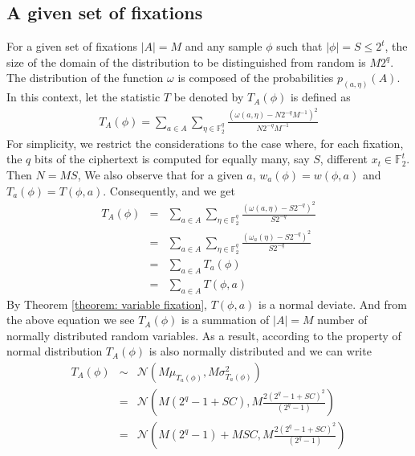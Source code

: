 \subsection{A given set of fixations}
For a given set of fixations $|A|=M$ and any sample $\phi$ such that $\lvert \phi \rvert = S \leq 2^t$, the size of the domain of the distribution to be distinguished from random is $M2^q$. The distribution of the function $\omega$ is composed of the probabilities $p_{\left(a,\eta\right)}(A)$. In this context, let the statistic $T$ be denoted by $T_{A}\left(\phi\right)$ is defined as
\begin{eqnarray}
T_{A}(\phi) = \displaystyle\sum_{a \in A}\displaystyle\sum_{\eta \in \mathbb{F}_{2}^{q}} \frac{(\omega(a,\eta) - N2^{-q}M^{-1})^2}{N2^{-q}M^{-1}}
\label{eqn:T_for_a_set_of_fixations}
\end{eqnarray} For simplicity, we restrict the considerations to the case where, for each
fixation, the $q$ bits of the ciphertext is computed for equally many, say $S$, different $x_t \in \mathbb{F}_{2}^{t}$. Then $N = MS$, We also observe that for a given $a$, $w_a\left(\phi\right) = w\left(\phi,a\right)$ and $T_{a}\left( \phi \right) = T\left(\phi,a\right)$. Consequently, and we get 
\begin{eqnarray*}
T_{A}(\phi) &=& \displaystyle\sum_{a \in A}\displaystyle\sum_{\eta \in \mathbb{F}_{2}^{q}} \frac{(\omega(a,\eta) - S2^{-q})^2}{S2^{-q}} \\
&=& \displaystyle\sum_{a \in A}\displaystyle\sum_{\eta \in \mathbb{F}_{2}^{q}} \frac{(\omega_a(\eta) - S2^{-q})^2}{S2^{-q}} \\
&=& \displaystyle\sum_{a \in A}T_{a}(\phi)\\
&=& \displaystyle\sum_{a \in A}T(\phi,a) 
\end{eqnarray*}
By Theorem \ref{theorem: variable fixation}, $T(\phi,a)$ is a normal deviate. And from the above equation we see $T_{A}\left(\phi\right)$ is a summation of $\lvert A \rvert = M$ number of normally distributed random variables. As a result, according to the property of normal distribution $T_{A}\left(\phi\right)$ is also normally distributed and we can write
\begin{eqnarray*}
T_{A}(\phi) &\sim & \mathcal{N}\left(M\mu_{T_{a}(\phi)},M\sigma_{T_{a}(\phi)}^2\right)\\
&=& \mathcal{N}\left(M(2^q-1+SC),M\frac{2(2^q -1 +SC)^2}{(2^q -1)}\right)\\
&=& \mathcal{N}\left(M(2^q-1)+MSC,M\frac{2(2^q -1 +SC)^2}{(2^q -1)}\right)\\
\end{eqnarray*}
